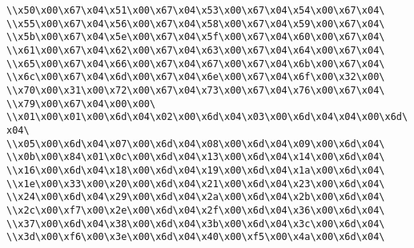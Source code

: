 \verb|\\x50\x00\x67\x04\x51\x00\x67\x04\x53\x00\x67\x04\x54\x00\x67\x04\|\newline
\verb|\\x55\x00\x67\x04\x56\x00\x67\x04\x58\x00\x67\x04\x59\x00\x67\x04\|\newline
\verb|\\x5b\x00\x67\x04\x5e\x00\x67\x04\x5f\x00\x67\x04\x60\x00\x67\x04\|\newline
\verb|\\x61\x00\x67\x04\x62\x00\x67\x04\x63\x00\x67\x04\x64\x00\x67\x04\|\newline
\verb|\\x65\x00\x67\x04\x66\x00\x67\x04\x67\x00\x67\x04\x6b\x00\x67\x04\|\newline
\verb|\\x6c\x00\x67\x04\x6d\x00\x67\x04\x6e\x00\x67\x04\x6f\x00\x32\x00\|\newline
\verb|\\x70\x00\x31\x00\x72\x00\x67\x04\x73\x00\x67\x04\x76\x00\x67\x04\|\newline
\verb|\\x79\x00\x67\x04\x00\x00\|\newline
\verb|\\x01\x00\x01\x00\x6d\x04\x02\x00\x6d\x04\x03\x00\x6d\x04\x04\x00\x6d\x04\|\newline
\verb|\\x05\x00\x6d\x04\x07\x00\x6d\x04\x08\x00\x6d\x04\x09\x00\x6d\x04\|\newline
\verb|\\x0b\x00\x84\x01\x0c\x00\x6d\x04\x13\x00\x6d\x04\x14\x00\x6d\x04\|\newline
\verb|\\x16\x00\x6d\x04\x18\x00\x6d\x04\x19\x00\x6d\x04\x1a\x00\x6d\x04\|\newline
\verb|\\x1e\x00\x33\x00\x20\x00\x6d\x04\x21\x00\x6d\x04\x23\x00\x6d\x04\|\newline
\verb|\\x24\x00\x6d\x04\x29\x00\x6d\x04\x2a\x00\x6d\x04\x2b\x00\x6d\x04\|\newline
\verb|\\x2c\x00\xf7\x00\x2e\x00\x6d\x04\x2f\x00\x6d\x04\x36\x00\x6d\x04\|\newline
\verb|\\x37\x00\x6d\x04\x38\x00\x6d\x04\x3b\x00\x6d\x04\x3c\x00\x6d\x04\|\newline
\verb|\\x3d\x00\xf6\x00\x3e\x00\x6d\x04\x40\x00\xf5\x00\x4a\x00\x6d\x04\|\newline
